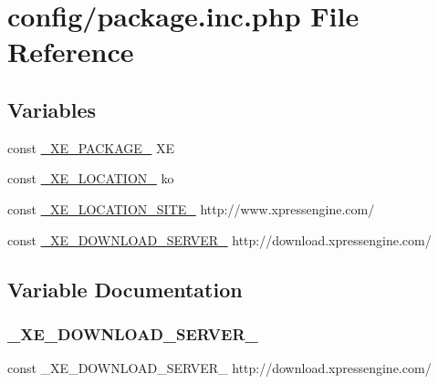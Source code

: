 \hypertarget{package_8inc_8php}{}\section{config/package.inc.\+php File Reference}
\label{package_8inc_8php}
\subsection*{Variables}
\begin{DoxyCompactItemize}
\item 
const \hyperlink{package_8inc_8php_ac4384cdc784342cd44d75952334decb4}{\+\_\+\+X\+E\+\_\+\+P\+A\+C\+K\+A\+G\+E\+\_\+} \textquotesingle{}XE\textquotesingle{}
\item 
const \hyperlink{package_8inc_8php_a7330debbfb3a027cdd5f3d3dd1dfbdd0}{\+\_\+\+X\+E\+\_\+\+L\+O\+C\+A\+T\+I\+O\+N\+\_\+} \textquotesingle{}ko\textquotesingle{}
\item 
const \hyperlink{package_8inc_8php_a063bfd2eb9f811b1676d0dbc0cad2648}{\+\_\+\+X\+E\+\_\+\+L\+O\+C\+A\+T\+I\+O\+N\+\_\+\+S\+I\+T\+E\+\_\+} \textquotesingle{}http\+://www.\+xpressengine.\+com/\textquotesingle{}
\item 
const \hyperlink{package_8inc_8php_a22df32d3e0eae0d60d6cddb9ec99d5ec}{\+\_\+\+X\+E\+\_\+\+D\+O\+W\+N\+L\+O\+A\+D\+\_\+\+S\+E\+R\+V\+E\+R\+\_\+} \textquotesingle{}http\+://download.\+xpressengine.\+com/\textquotesingle{}
\end{DoxyCompactItemize}


\subsection{Variable Documentation}
\hypertarget{package_8inc_8php_a22df32d3e0eae0d60d6cddb9ec99d5ec}{}\label{package_8inc_8php_a22df32d3e0eae0d60d6cddb9ec99d5ec} 
\subsubsection{\texorpdfstring{\+\_\+\+X\+E\+\_\+\+D\+O\+W\+N\+L\+O\+A\+D\+\_\+\+S\+E\+R\+V\+E\+R\+\_\+}{\_XE\_DOWNLOAD\_SERVER\_}}
{\footnotesize\ttfamily const \+\_\+\+X\+E\+\_\+\+D\+O\+W\+N\+L\+O\+A\+D\+\_\+\+S\+E\+R\+V\+E\+R\+\_\+ \textquotesingle{}http\+://download.\+xpressengine.\+com/\textquotesingle{}}



